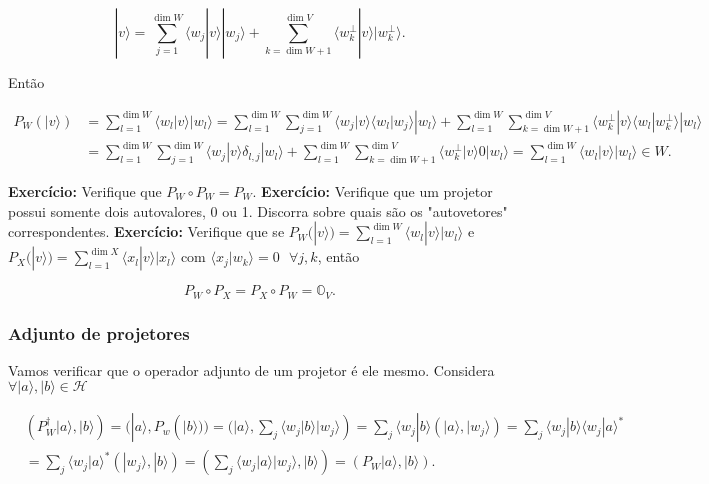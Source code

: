 \documentclass[11pt]{article}
\begin{document}
\begin{equation}
|v\rangle = \sum_{j=1}^{\dim W}\langle w_{j}|v\rangle|w_{j}\rangle + \sum_{k=\dim W+1}^{\dim V}\langle w^{\perp}_{k}|v\rangle|w^{\perp}_{k}\rangle.
\end{equation}

Então

\begin{align}
P_{W}(|v\rangle) & = \sum_{l=1}^{\dim W}\langle w_{l}|v\rangle|w_{l}\rangle = \sum_{l=1}^{\dim W}\sum_{j=1}^{\dim W}\langle w_{j}|v\rangle\langle w_{l}|w_{j}\rangle|w_{l}\rangle + \sum_{l=1}^{\dim W}\sum_{k=\dim W+1}^{\dim V}\langle w^{\perp}_{k}|v\rangle\langle w_{l}|w^{\perp}_{k}\rangle|w_{l}\rangle \\
& = \sum_{l=1}^{\dim W}\sum_{j=1}^{\dim W}\langle w_{j}|v\rangle\delta_{l,j}|w_{l}\rangle + \sum_{l=1}^{\dim W}\sum_{k=\dim W+1}^{\dim V}\langle w^{\perp}_{k}|v\rangle 0|w_{l}\rangle = \sum_{l=1}^{\dim W}\langle w_{l}|v\rangle|w_{l}\rangle \in W.
\end{align}

    \textbf{Exercício:} Verifique que \(P_{W}\circ P_{W}=P_{W}\).
\textbf{Exercício:} Verifique que um projetor possui somente dois
autovalores, 0 ou 1. Discorra sobre quais são os "autovetores"
correspondentes. \textbf{Exercício:} Verifique que se
\(P_{W}(|v\rangle) = \sum_{l=1}^{\dim W}\langle w_{l}|v\rangle|w_{l}\rangle\)
e
\(P_{X}(|v\rangle) = \sum_{l=1}^{\dim X}\langle x_{l}|v\rangle|x_{l}\rangle\)
com \(\langle x_{j}|w_{k}\rangle=0\text{ } \forall j,k\), então

\begin{equation}
P_{W}\circ P_{X} = P_{X}\circ P_{W} = \mathbb{O}_{V}.
\end{equation}

\subsubsection{Adjunto de projetores}\label{adjunto-de-projetores}

Vamos verificar que o operador adjunto de um projetor é ele mesmo.
Considera \(\forall|a\rangle,|b\rangle\in\mathcal{H}\)

\begin{align}
& (P_{W}^{\dagger}|a\rangle,|b\rangle)=(|a\rangle,P_{w}(|b\rangle)) = (|a\rangle,\sum_{j}\langle w_{j}|b\rangle|w_{j}\rangle)  = \sum_{j}\langle w_{j}|b\rangle(|a\rangle,|w_{j}\rangle) = \sum_{j}\langle w_{j}|b\rangle\langle w_{j}|a\rangle^{*} \\
& = \sum_{j}\langle w_{j}|a\rangle^{*}(|w_{j}\rangle,|b\rangle) = (\sum_{j}\langle w_{j}|a\rangle|w_{j}\rangle,|b\rangle) = (P_{W}|a\rangle,|b\rangle).
\end{align}
\end{document}
